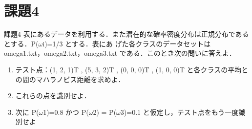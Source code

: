\documentclass[10pt,a4paper,twocolumn]{jarticle}
\begin{document}
\section{課題4}
\begin{itembox}{課題4}
  表にあるデータを利用する．また潜在的な確率密度分布は正規分布であるとする．P($\omega$i)=1/3 とする．表にあ
  げた各クラスのデータセットは omega1.txt，omega2.txt，omega3.txt である．このとき次の問いに答えよ．

  \begin{enumerate}
    \item テスト点：(1, 2, 1)T , (5, 3, 2)T , (0, 0, 0)T , (1, 0, 0)T と各クラスの平均との間のマハラノビス距離を求めよ．
    \item これらの点を識別せよ．
    \item 次に P($\omega$1)=0.8 かつ P($\omega$2) = P($\omega$3)=0.1 と仮定し，テスト点をもう一度識別せよ
  \end{enumerate}
\end{itembox}

\end{document}
